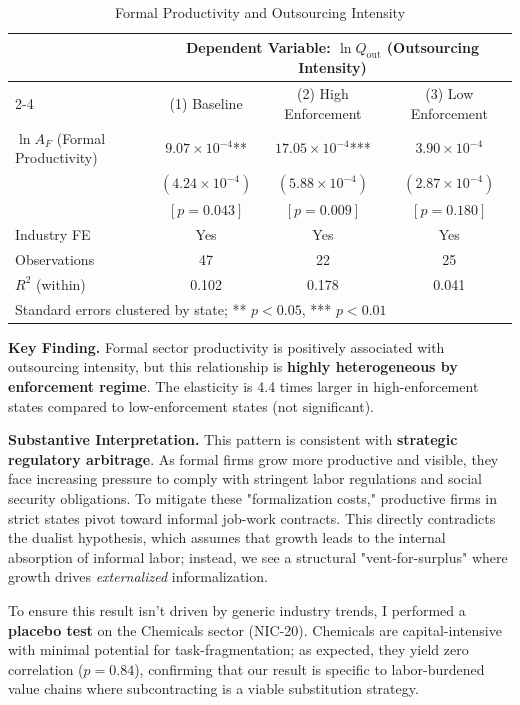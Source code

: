 \documentclass[12pt, a4paper]{article}
\begin{document}
\begin{table}[H]
  \centering
  \caption{Formal Productivity and Outsourcing Intensity}
  \label{tab:outsourcing_results}
  \begin{tabular}{lccc}
    \toprule
    & \multicolumn{3}{c}{Dependent Variable: $\ln Q_{\text{out}}$ (Outsourcing Intensity)} \\
    \cmidrule(lr){2-4}
    & (1) Baseline & (2) High Enforcement & (3) Low Enforcement \\
    \midrule
    $\ln A_{F}$ (Formal Productivity) & $9.07\times10^{-4}$** & $17.05\times10^{-4}$*** & $3.90\times10^{-4}$ \\
    & $(4.24\times10^{-4})$ & $(5.88\times10^{-4})$ & $(2.87\times10^{-4})$ \\
    & $[p=0.043]$ & $[p=0.009]$ & $[p=0.180]$ \\
    \midrule
    Industry FE & Yes & Yes & Yes \\
    Observations & 47 & 22 & 25 \\
    $R^2$ (within) & 0.102 & 0.178 & 0.041 \\
    \bottomrule
    \multicolumn{4}{l}{\small Standard errors clustered by state; ** $p<0.05$, *** $p<0.01$}
  \end{tabular}
\end{table}

\textbf{Key Finding.} Formal sector productivity is positively associated with outsourcing intensity, but this relationship is \textbf{highly heterogeneous by enforcement regime}. The elasticity is 4.4 times larger in high-enforcement states compared to low-enforcement states (not significant).

\textbf{Substantive Interpretation.} This pattern is consistent with \textbf{strategic regulatory arbitrage}. As formal firms grow more productive and visible, they face increasing pressure to comply with stringent labor regulations and social security obligations. To mitigate these "formalization costs," productive firms in strict states pivot toward informal job-work contracts. This directly contradicts the dualist hypothesis, which assumes that growth leads to the internal absorption of informal labor; instead, we see a structural "vent-for-surplus" where growth drives \textit{externalized} informalization.

To ensure this result isn't driven by generic industry trends, I performed a \textbf{placebo test} on the Chemicals sector (NIC-20). Chemicals are capital-intensive with minimal potential for task-fragmentation; as expected, they yield zero correlation ($p=0.84$), confirming that our result is specific to labor-burdened value chains where subcontracting is a viable substitution strategy.
\end{document}

